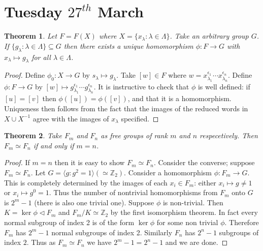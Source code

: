 \documentclass[a4paper,10pt]{article}
\newcommand{\ZZ}{\mathbb{Z}}
\newtheorem{thm}{Theorem}
\begin{document}
\newpage
\section{Tuesday $27^{th}$ March}

\begin{thm}
Let $F = F(X)$ where $X = \{ x_\lambda : \lambda \in \Lambda \}$. Take an arbitrary group $G$. If $\{ g_\lambda : \lambda \in \Lambda \} \subseteq G$ then there exists a unique homomorphism $\phi : F \rightarrow G$ with $x_\lambda \mapsto g_\lambda$ for all $\lambda \in \Lambda$. 
\end{thm}

\begin{proof}
Define $\phi_0 : X \rightarrow G$ by $s_\lambda \mapsto g_\lambda$. Take $[w] \in F$ where $w = x^{\epsilon_1}_{\lambda_1} \cdots x^{\epsilon_n}_{\lambda_n}$. Define $\phi : F \rightarrow G$ by $[w] \mapsto g^{\epsilon_1}_{\lambda_1} \cdots g^{\epsilon_n}_{\lambda_n}$. It is instructive to check that $\phi$ is well defined: if $[u] = [v]$ then $\phi([u]) = \phi([v])$, and that it is a homomorphism. Uniqueness then follows from the fact that the images of the reduced words in $X \cup X^{-1}$ agree with the images of $x_\lambda$ specified. 
\end{proof}

\begin{thm}
Take $F_m$ and $F_n$ as free groups of rank $m$ and $n$ respecetively. Then $F_m \simeq F_n$ if and only if $m = n$. 
\end{thm}

\begin{proof}
If $m = n$ then it is easy to show $F_m \simeq F_n$. Consider the converse; suppose $F_m \simeq F_n$. Let $G = \langle g : g^2 = 1 \rangle (\simeq \ZZ_2)$. Consider a homomorphism $\phi : F_m \rightarrow G$. This is completely determined by the images of each $x_i \in F_m$: either $x_i \mapsto g \neq 1$ or $x_i \mapsto g^0 = 1$. Thus the number of nontrivial homomorphisms from $F_m$ onto $G$ is $2^m - 1$ (there is also one trivial one). Suppose $\phi$ is non-trivial. Then $K = \ker \phi \triangleleft F_m$ and $F_m / K \simeq \ZZ_2$ by the first isomorphism theorem. In fact every normal subgroup of index 2 is of the form $\ker \phi$ for some non trivial $\phi$. Therefore $F_m$ has $2^m - 1$ normal subgroups of index 2. Similarly $F_n$ has $2^n - 1$ subgroups of index $2$. Thus as $F_m \simeq F_n$ we have $2^m - 1 = 2^n - 1$ and we are done.
\end{proof}
\end{document}
